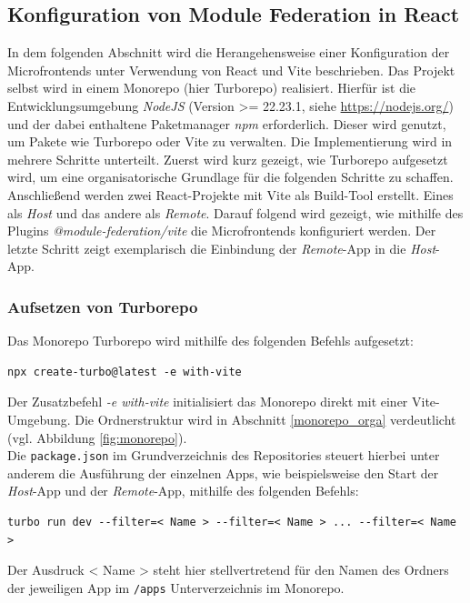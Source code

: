 \subsection{Konfiguration von Module Federation in React}
In dem folgenden Abschnitt wird die Herangehensweise einer Konfiguration der Microfrontends unter Verwendung von React und Vite beschrieben. Das Projekt selbst wird in einem Monorepo (hier Turborepo) realisiert.
Hierfür ist die Entwicklungsumgebung \textit{NodeJS} (Version >= 22.23.1, siehe \url{https://nodejs.org/}) und der dabei enthaltene Paketmanager \textit{npm} erforderlich. Dieser wird genutzt, um Pakete wie Turborepo oder Vite zu verwalten.
Die Implementierung wird in mehrere Schritte unterteilt. Zuerst wird kurz gezeigt, wie Turborepo aufgesetzt wird, um eine organisatorische Grundlage für die folgenden Schritte zu schaffen. Anschließend werden
zwei React-Projekte mit Vite als Build-Tool erstellt. Eines als \textit{Host} und das andere als \textit{Remote}. Darauf folgend wird gezeigt, wie mithilfe des Plugins \textit{@module-federation/vite} die Microfrontends konfiguriert werden.
Der letzte Schritt zeigt exemplarisch die Einbindung der \textit{Remote}-App in die \textit{Host}-App.
\subsubsection{Aufsetzen von Turborepo}
Das Monorepo Turborepo wird mithilfe des folgenden Befehls aufgesetzt:
\begin{lstlisting}[language=Shell, caption={Aufsetzen von Turborepo}, label={lst:microfrontends_turborepo}]
npx create-turbo@latest -e with-vite
\end{lstlisting}
Der Zusatzbefehl \textit{-e with-vite} initialisiert das Monorepo direkt mit einer Vite-Umgebung. Die Ordnerstruktur wird in Abschnitt \ref{monorepo_orga} verdeutlicht (vgl. Abbildung \ref{fig:monorepo}). \\
Die \texttt{package.json} im Grundverzeichnis des Repositories steuert hierbei unter anderem die Ausführung der einzelnen Apps, wie beispielsweise den Start der \textit{Host}-App und der \textit{Remote}-App, mithilfe des folgenden Befehls:
\begin{lstlisting}[language=Shell, caption={Starten der Apps}, label={lst:microfrontends_apps_start}]
turbo run dev --filter=< Name > --filter=< Name > ... --filter=< Name >
\end{lstlisting}
Der Ausdruck < Name > steht hier stellvertretend für den Namen des Ordners der jeweiligen App im \texttt{/apps} Unterverzeichnis im Monorepo.
